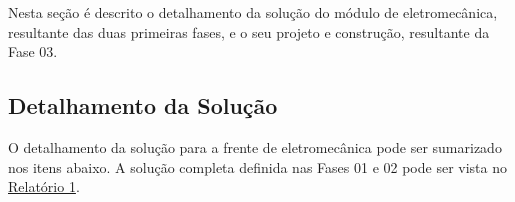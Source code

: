  \label{desenvolvimento_eletromecanica}
Nesta seção é descrito o detalhamento da solução do módulo de eletromecânica, resultante das duas primeiras fases,
e o seu projeto e construção, resultante da Fase 03.

\subsection{Detalhamento da Solução}

O detalhamento da solução para a frente de eletromecânica pode ser sumarizado nos itens abaixo. A solução completa definida nas
  Fases 01 e 02 pode ser vista no \href{https://drive.google.com/file/d/0B5InkGKx6O-MR1B3eVYzZFpjQ3c/view?usp=sharing}{Relatório 1}.







